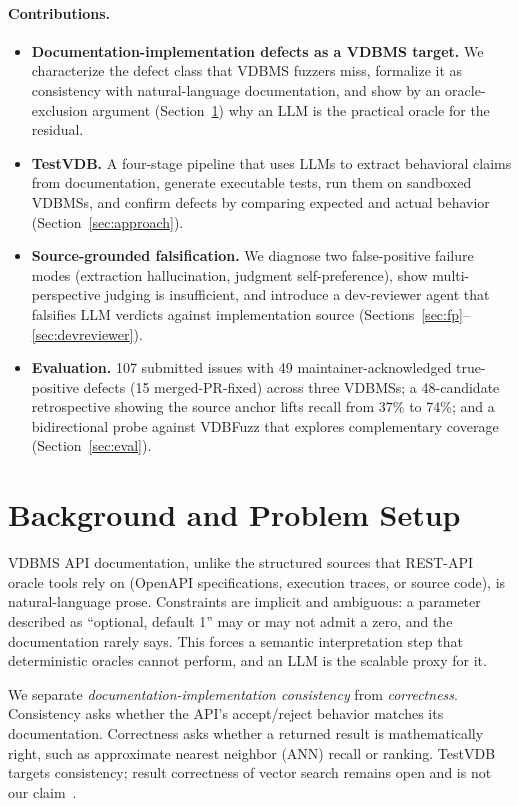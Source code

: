 \documentclass[sigconf]{acmart}
\begin{document}
\paragraph{Contributions.}
\begin{itemize}
  \item \textbf{Documentation-implementation defects as a VDBMS target.} We characterize the defect class that VDBMS fuzzers miss, formalize it as consistency with natural-language documentation, and show by an oracle-exclusion argument (Section~\ref{sec:background}) why an LLM is the practical oracle for the residual.
  \item \textbf{TestVDB.} A four-stage pipeline that uses LLMs to extract behavioral claims from documentation, generate executable tests, run them on sandboxed VDBMSs, and confirm defects by comparing expected and actual behavior (Section~\ref{sec:approach}).
  \item \textbf{Source-grounded falsification.} We diagnose two false-positive failure modes (extraction hallucination, judgment self-preference), show multi-perspective judging is insufficient, and introduce a dev-reviewer agent that falsifies LLM verdicts against implementation source (Sections~\ref{sec:fp}--\ref{sec:devreviewer}).
  \item \textbf{Evaluation.} 107 submitted issues with 49 maintainer-acknowledged true-positive defects (15 merged-PR-fixed) across three VDBMSs; a 48-candidate retrospective showing the source anchor lifts recall from 37\% to 74\%; and a bidirectional probe against VDBFuzz that explores complementary coverage (Section~\ref{sec:eval}).
\end{itemize}

\section{Background and Problem Setup}
\label{sec:background}

VDBMS API documentation, unlike the structured sources that REST-API oracle tools rely on (OpenAPI specifications, execution traces, or source code), is natural-language prose. Constraints are implicit and ambiguous: a parameter described as ``optional, default 1'' may or may not admit a zero, and the documentation rarely says. This forces a semantic interpretation step that deterministic oracles cannot perform, and an LLM is the scalable proxy for it.

We separate \emph{documentation-implementation consistency} from \emph{correctness}. Consistency asks whether the API's accept/reject behavior matches its documentation. Correctness asks whether a returned result is mathematically right, such as approximate nearest neighbor (ANN) recall or ranking. TestVDB targets consistency; result correctness of vector search remains open and is not our claim~\cite{roadmap25}.
\end{document}
